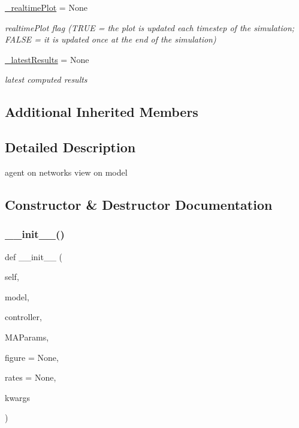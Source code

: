 \begin{DoxyCompactItemize}
\hyperlink{class_mu_mo_t_1_1_mu_mo_t_1_1_mu_mo_tmultiagent_view_a194d04e5fee40987d78aa7e1f721ea28}{\+\_\+realtime\+Plot} = None
\begin{DoxyCompactList}\small\item\em realtime\+Plot flag (T\+R\+UE = the plot is updated each timestep of the simulation; F\+A\+L\+SE = it is updated once at the end of the simulation) \end{DoxyCompactList}\item 
\hyperlink{class_mu_mo_t_1_1_mu_mo_t_1_1_mu_mo_tmultiagent_view_a8da8c49a2b0ccc518cf7f333bdbd17a6}{\+\_\+latest\+Results} = None
\begin{DoxyCompactList}\small\item\em latest computed results \end{DoxyCompactList}\end{DoxyCompactItemize}
\subsection*{Additional Inherited Members}


\subsection{Detailed Description}
agent on networks view on model 

\subsection{Constructor \& Destructor Documentation}
\mbox{\label{class_mu_mo_t_1_1_mu_mo_t_1_1_mu_mo_tmultiagent_view_a3245dc2f896377d0265400e8181e7502}} 
\subsubsection{\texorpdfstring{\+\_\+\+\_\+init\+\_\+\+\_\+()}{\_\_init\_\_()}}
{\footnotesize\ttfamily def \+\_\+\+\_\+init\+\_\+\+\_\+ (\begin{DoxyParamCaption}\item[{}]{self,  }\item[{}]{model,  }\item[{}]{controller,  }\item[{}]{M\+A\+Params,  }\item[{}]{figure = {\ttfamily None},  }\item[{}]{rates = {\ttfamily None},  }\item[{}]{kwargs }\end{DoxyParamCaption})}




